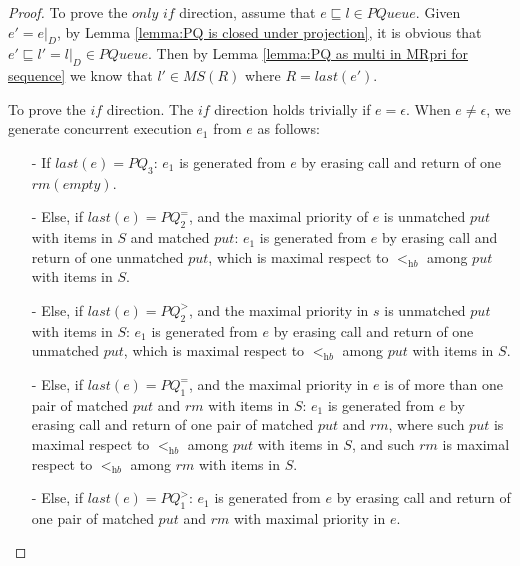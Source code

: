 \begin {proof}

To prove the $\textit{only if}$ direction, assume that $e \sqsubseteq l \in \textit{PQueue}$. Given $e' = e \vert_{D}$, by Lemma \ref{lemma:PQ is closed under projection}, it is obvious that $e' \sqsubseteq l' = l \vert_{D} \in \textit{PQueue}$. Then by Lemma \ref{lemma:PQ as multi in MRpri for sequence} we know that $l' \in \textit{MS}(R)$ where $R = \textit{last}(e')$.

To prove the $\textit{if}$ direction. The $\textit{if}$ direction holds trivially if $e = \epsilon$. When $e \neq \epsilon$, we generate concurrent execution $e_1$ from $e$ as follows:

\begin{itemize}
\setlength{\itemsep}{0.5pt}
\item[-] If $\textit{last}(e) = \textit{PQ}_3$: $e_1$ is generated from $e$ by erasing call and return of one $\textit{rm}(\textit{empty})$.

\item[-] Else, if $\textit{last}(e) = \textit{PQ}_2^{=}$, and the maximal priority of $e$ is unmatched $\textit{put}$ with items in $S$ and matched $\textit{put}$: $e_1$ is generated from $e$ by erasing call and return of one unmatched $\textit{put}$, which is maximal respect to $<_{\textit{hb}}$ among $\textit{put}$ with items in $S$.

\item[-] Else, if $\textit{last}(e) = \textit{PQ}_2^{>}$, and the maximal priority in $s$ is unmatched $\textit{put}$ with items in $S$: $e_1$ is generated from $e$ by erasing call and return of one unmatched $\textit{put}$, which is maximal respect to $<_{\textit{hb}}$ among $\textit{put}$ with items in $S$.

\item[-] Else, if $\textit{last}(e) = \textit{PQ}_1^{=}$, and the maximal priority in $e$ is of more than one pair of matched $\textit{put}$ and $\textit{rm}$ with items in $S$: $e_1$ is generated from $e$ by erasing call and return of one pair of matched $\textit{put}$ and $\textit{rm}$, where such $\textit{put}$ is maximal respect to $<_{\textit{hb}}$ among $\textit{put}$ with items in $S$, and such $\textit{rm}$ is maximal respect to $<_{\textit{hb}}$ among $\textit{rm}$ with items in $S$.

\item[-] Else, if $\textit{last}(e) = \textit{PQ}_1^{>}$: $e_1$ is generated from $e$ by erasing call and return of one pair of matched $\textit{put}$ and $\textit{rm}$ with maximal priority in $e$.
\end{itemize}


\end{proof}
